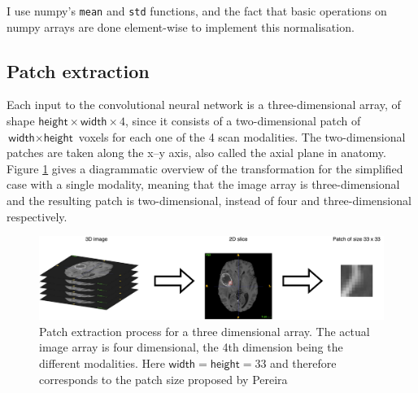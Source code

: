 \documentclass[12pt,a4paper,twoside,openright]{report}
\begin{document}
I use numpy's \texttt{mean} and \texttt{std} functions, and the fact that basic operations on numpy arrays are done element-wise to implement this normalisation.

\subsection{Patch extraction}
\label{section:patch_extraction}
Each input to the convolutional neural network is a three-dimensional array, of shape $\textsf{height} \times \textsf{width} \times 4$, since it consists of a two-dimensional patch of $\textsf{width} \times \textsf{height}$ voxels for each one of the 4 scan modalities. The two-dimensional patches are taken along the x--y axis, also called the axial plane in anatomy. Figure \ref{fig:patch_extraction} gives a diagrammatic overview of the transformation for the simplified case with a single modality, meaning that the image array is three-dimensional and the resulting patch is two-dimensional, instead of four and three-dimensional respectively.
\begin{figure}
	\centering
	\includegraphics[width=\textwidth]{patch_extraction}
	\caption[Patch extraction process for a three dimensional array.]{Patch extraction process for a three dimensional array. The actual image array is four dimensional, the 4th dimension being the different modalities. Here $\textsf{width}=\textsf{height}=33$ and therefore corresponds to the patch size proposed by Pereira}
	\label{fig:patch_extraction}
\end{figure}
\end{document}
